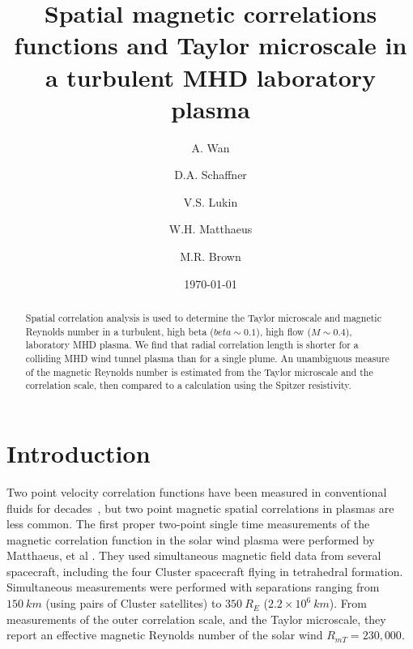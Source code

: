 \documentclass[aip,prl,amsmath,amssymb,reprint,superscriptaddress]{revtex4-1} %
\begin{document}
\title{Spatial magnetic correlations functions and Taylor microscale in a turbulent MHD laboratory plasma}

\author{A. Wan}
\author{D.A. Schaffner}
\author{V.S. Lukin}
\author{W.H. Matthaeus}
\author{M.R. Brown}
\date{\today}
\begin{abstract}
Spatial correlation analysis is used to determine the Taylor microscale and magnetic Reynolds number in a turbulent, high beta ($beta \sim 0.1$), high flow ($M\sim 0.4$), laboratory MHD plasma.  We find that radial correlation length is shorter for a colliding MHD wind tunnel plasma than for a single plume.  An unambiguous measure of the magnetic Reynolds number is estimated from the Taylor microscale and the correlation scale, then compared to a calculation using the Spitzer resistivity.
\end{abstract}

\maketitle

\section{Introduction}

Two point velocity correlation functions have been measured in conventional fluids for decades~\cite{frisch95,Belmabrouk98}, but two point magnetic spatial correlations in plasmas are less common.  The first proper two-point single time measurements of the magnetic correlation function in the solar wind plasma were performed by Matthaeus, et al \cite{Matthaeus05}.  They used simultaneous magnetic field data from several spacecraft, including the four Cluster spacecraft flying in tetrahedral formation.  Simultaneous measurements were performed with separations ranging from $150~km$ (using pairs of Cluster satellites) to $350~R_E$ ($2.2 \times 10^6~km$).  From measurements of the outer correlation scale, and the Taylor microscale, they report an effective magnetic Reynolds number of the solar wind $R_{mT}  = 230,000$.
\end{document}
